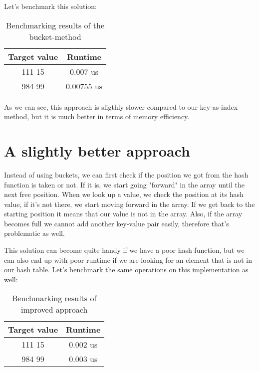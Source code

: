 \documentclass[a4paper,11pt]{article}
\begin{document}
    Let's benchmark this solution:

    \begin{table}[H]
        \begin{center}
        \begin{tabular}{c|c}
        \textbf{Target value} & \textbf{Runtime}\\
        \hline
            111 15     &  0.007 us\\
            984 99    &  0.00755 us\\
        \end{tabular}
        \caption{Benchmarking results of the bucket-method}
        \label{tab:table2}
        \end{center}
        \end{table}

    As we can see, this approach is sligthly slower compared to our key-as-index method, but it is much better in terms of memory efficiency.

    \section*{A slightly better approach}

    Instead of using buckets, we can first check if the position we got from the hash function is taken or not.
    If it is, we start going "forward" in the array until the next free position.
    When we look up a value, we check the position at its hash value, if it's not there, we start moving forward in the array.
    If we get back to the starting position it means that our value is not in the array.
    Also, if the array becomes full we cannot add another key-value pair easily, therefore that's problematic as well.
    
    This solution can become quite handy if we have a poor hash function, but we can also end up with poor runtime if we are looking for an element that is not in our hash table.
    Let's benchmark the same operations on this implementation as well:

    \begin{table}[H]
        \begin{center}
        \begin{tabular}{c|c}
        \textbf{Target value} & \textbf{Runtime}\\
        \hline
            111 15     &  0.002 us\\
            984 99    &  0.003 us\\
        \end{tabular}
        \caption{Benchmarking results of improved approach}
        \label{tab:table2}
        \end{center}
        \end{table}
\end{document}
